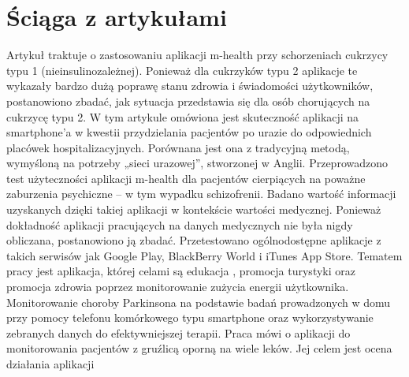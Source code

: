 \chapter{Ściąga z artykułami}
\label{cha:sciaga}

\cite{JoMIRPalmert2012DesignofanmHealthAppfortheSelf-managementofAdolescentType1Diabetes:APilotStudy} Artykuł traktuje o zastosowaniu aplikacji m-health przy schorzeniach cukrzycy typu 1 (nieinsulinozależnej). Ponieważ dla cukrzyków typu 2 aplikacje te wykazały bardzo dużą poprawę stanu zdrowia i świadomości użytkowników, postanowiono zbadać, jak sytuacja przedstawia się dla osób chorujących na cukrzycę typu 2.
\cite{IENEleanorS.Freshwater2014Technologyfortrauma:testingthevalidityofasmartphoneappforpre-hospitalclinicians} W tym artykule omówiona jest skuteczność aplikacji na smartphone'a w kwestii przydzielania pacjentów po urazie do odpowiednich placówek hospitalizacyjnych. Porównana jest ona z tradycyjną metodą, wymyśloną na potrzeby „sieci urazowej”, stworzonej w Anglii.
\cite{AjopDavidKimhy2014Useofmobileassessmenttechnologiesininpatientpsychiatricsettings} Przeprowadzono test użyteczności aplikacji m-health dla pacjentów cierpiących na poważne zaburzenia psychiczne – w tym wypadku schizofrenii. Badano wartość informacji uzyskanych dzięki takiej aplikacji w kontekście wartości medycznej.
\cite{JomIrBierbrier2014EvaluationoftheAccuracyofSmartphoneMedicalCalculationApps} Ponieważ dokładność aplikacji pracujących na danych medycznych nie była nigdy obliczana, postanowiono ją zbadać. Przetestowano ogólnodostępne aplikacje z takich serwisów jak Google Play, BlackBerry World i iTunes App Store.
\cite{MPiEKer-Cheng2014ASmartphoneAPPforHealthandTourismPromotionSmartphones;Tourism;Colleges&universities;Marketing;Historicbuildings&sites;Festivals;Parks&recreationareas;Onlineinstruction;Folklore;Scienceeducation;Ruralareas;Mountainclimbing} Tematem pracy jest aplikacja, której celami są edukacja , promocja turystyki oraz promocja zdrowia poprzez monitorowanie zużycia energii użytkownika.
\cite{AICPSSanders2013RemotesmartphonemonitoringformanagementofParkinsonsDiseaseEEGaccelerationactivitymonitoringelectroencephalogrammobilecomputingsensorsmart-phonewatchwrist} Monitorowanie choroby Parkinsona na podstawie badań prowadzonych w domu przy pomocy telefonu komórkowego typu smartphone oraz wykorzystywanie zebranych danych do efektywniejszej terapii.
\cite{POChaiyachati2013APilotStudyofanmHealthApplicationforHealthcareWorkers:PoorUptakeDespiteHighReportedAcceptabilityataRuralSouthAfricanCommunity-BasedMDR-TBTreatmentProgramHospitals;Tuberculosis;Studies;Intervention;Workers;Patients} Praca mówi o aplikacji do monitorowania pacjentów z gruźlicą oporną na wiele leków. Jej celem jest ocena działania aplikacji
